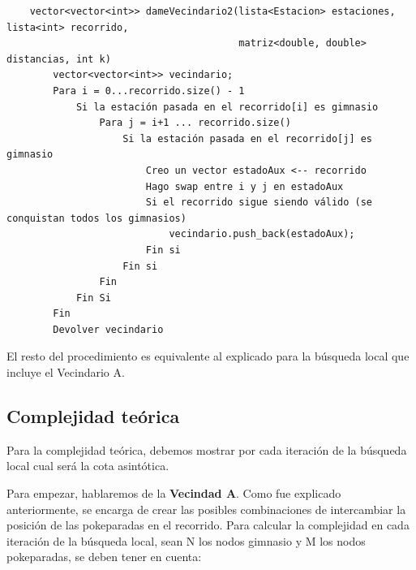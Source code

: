     \begin{codesnippet}
    \begin{verbatim}
    vector<vector<int>> dameVecindario2(lista<Estacion> estaciones, lista<int> recorrido,
                                        matriz<double, double> distancias, int k)
        vector<vector<int>> vecindario;
        Para i = 0...recorrido.size() - 1
            Si la estación pasada en el recorrido[i] es gimnasio
                Para j = i+1 ... recorrido.size()
                    Si la estación pasada en el recorrido[j] es gimnasio
                        Creo un vector estadoAux <-- recorrido
                        Hago swap entre i y j en estadoAux
                        Si el recorrido sigue siendo válido (se conquistan todos los gimnasios)
                            vecindario.push_back(estadoAux);
                        Fin si
                    Fin si
                Fin
            Fin Si
        Fin
        Devolver vecindario
    \end{verbatim}
    \end{codesnippet}
    
    \par El resto del procedimiento es equivalente al explicado para la búsqueda local que incluye el Vecindario A.
   
    \subsection{Complejidad teórica}
        Para la complejidad teórica, debemos mostrar por cada iteración de la búsqueda local cual será la cota asintótica. 
        \par Para empezar, hablaremos de la \textbf{Vecindad A}. Como fue explicado anteriormente, se encarga de crear las posibles combinaciones de intercambiar la posición de las pokeparadas en el recorrido. Para calcular la complejidad en cada iteración de la búsqueda local, sean N los nodos gimnasio y M los nodos pokeparadas, se deben tener en cuenta:

